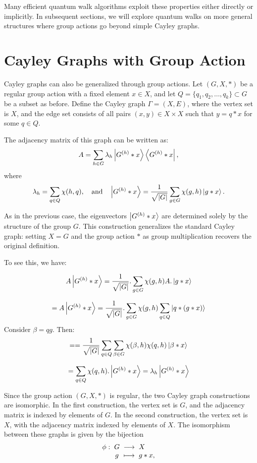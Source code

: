 \documentclass[12pt]{report}
\begin{document}
Many efficient quantum walk algorithms exploit these properties either directly or implicitly. In subsequent sections, we will explore quantum walks on more general structures where group actions go beyond simple Cayley graphs.







\section{Cayley Graphs with Group Action}


Cayley graphs can also be generalized through group actions. Let \( (G, X, *) \) be a regular group action with a fixed element \( x \in X \), and let \( Q = \{q_1, q_2, \dots, q_k\} \subset G \) be a subset as before. Define the Cayley graph \( \Gamma = (X, E) \), where the vertex set is \( X \), and the edge set consists of all pairs \( (x, y) \in X \times X \) such that \( y = q * x \) for some \( q \in Q \).

The adjacency matrix of this graph can be written as:
\[
A = \sum_{h \in G} \lambda_h \ket{G^{(h)} * x} \bra{G^{(h)} * x},
\]
where
\[
\lambda_h = \sum_{q \in Q} \chi(h, q), \quad \text{and} \quad \ket{G^{(h)} * x} = \frac{1}{\sqrt{|G|}} \sum_{g \in G} \chi(g, h) \ket{g * x}.
\]

As in the previous case, the eigenvectors \( \ket{G^{(h)} * x} \) are determined solely by the structure of the group \( G \). This construction generalizes the standard Cayley graph: setting \( X = G \) and the group action \( * \) as group multiplication recovers the original definition.


To see this, we have:

\[
    A\ket{G^{(h)}*x} = \frac{1}{\sqrt{|G|}}.\sum_{g \in G}\chi(g,h) A.\ket{g*x}
    \]

    \[
    = A\ket{G^{(h)}*x} = \frac{1}{\sqrt{|G|}}.\sum_{g \in G}\chi(g,h)\sum_{q \in Q}\ket{q*(g*x)}
    \]
    Consider $\beta = qg$. Then:
    \[
    = = \frac{1}{\sqrt{|G|}}\sum_{q \in Q}\sum_{\beta \in G}\chi(\beta,h)\chi(q,h)\ket{\beta * x}
    \]

    \[
    = \sum_{q \in Q}\chi(q,h).\ket{G^{(h)}*x} = \lambda_h \ket{G^{(h)}*x}
    \]

    Since the group action \( (G, X, *) \) is regular, the two Cayley graph constructions are isomorphic. In the first construction, the vertex set is \( G \), and the adjacency matrix is indexed by elements of \( G \). In the second construction, the vertex set is \( X \), with the adjacency matrix indexed by elements of \( X \). The isomorphism between these graphs is given by the bijection
\[
\setlength{\arraycolsep}{1mm}
\begin{array}{rcll}
\phi: & G & \longrightarrow & X \\
      & g & \longmapsto     & g * x,
\end{array}
\]
\end{document}
